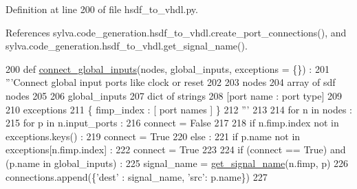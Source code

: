Definition at line 200 of file hsdf\+\_\+to\+\_\+vhdl.\+py.



References sylva.\+code\+\_\+generation.\+hsdf\+\_\+to\+\_\+vhdl.\+create\+\_\+port\+\_\+connections(), and sylva.\+code\+\_\+generation.\+hsdf\+\_\+to\+\_\+vhdl.\+get\+\_\+signal\+\_\+name().


\begin{DoxyCode}
200 \textcolor{keyword}{def }\hyperlink{namespacesylva_1_1code__generation_1_1hsdf__to__vhdl_a4a40923ef153cf1f1a9da0c742b2e542}{connect\_global\_inputs}(nodes, global\_inputs, exceptions = \{\}) :
201   \textcolor{stringliteral}{'''Connect global input ports like clock or reset}
202 \textcolor{stringliteral}{}
203 \textcolor{stringliteral}{    nodes}
204 \textcolor{stringliteral}{      array of sdf nodes}
205 \textcolor{stringliteral}{}
206 \textcolor{stringliteral}{    global\_inputs}
207 \textcolor{stringliteral}{      dict of strings}
208 \textcolor{stringliteral}{      [port name : port type]}
209 \textcolor{stringliteral}{}
210 \textcolor{stringliteral}{    exceptions}
211 \textcolor{stringliteral}{      \{ fimp\_index : [ port names ] \}}
212 \textcolor{stringliteral}{  '''}
213 
214   \textcolor{keywordflow}{for} n \textcolor{keywordflow}{in} nodes :
215     \textcolor{keywordflow}{for} p \textcolor{keywordflow}{in} n.input\_ports :
216       connect = \textcolor{keyword}{False}
217 
218       \textcolor{keywordflow}{if} n.fimp.index \textcolor{keywordflow}{not} \textcolor{keywordflow}{in} exceptions.keys() :
219         connect = \textcolor{keyword}{True}
220       \textcolor{keywordflow}{else} :
221         \textcolor{keywordflow}{if} p.name \textcolor{keywordflow}{not} \textcolor{keywordflow}{in} exceptions[n.fimp.index] :
222           connect = \textcolor{keyword}{True}
223 
224       \textcolor{keywordflow}{if} (connect == \textcolor{keyword}{True}) \textcolor{keywordflow}{and} (p.name \textcolor{keywordflow}{in} global\_inputs) :
225           signal\_name = \hyperlink{namespacesylva_1_1code__generation_1_1hsdf__to__vhdl_adfe6fda6b02f34c7fd4f2775ced8228f}{get\_signal\_name}(n.fimp, p)
226           connections.append(\{\textcolor{stringliteral}{'dest'} : signal\_name, \textcolor{stringliteral}{'src'}: p.name\})
227 
\end{DoxyCode}
\mbox{\label{namespacesylva_1_1code__generation_1_1hsdf__to__vhdl_a5976ee6a55f22e1fc1e9fc87bac3ea62}} 
